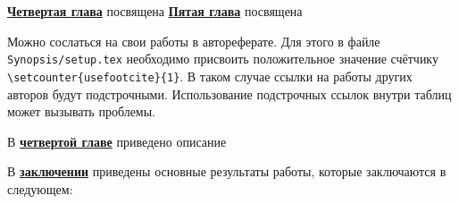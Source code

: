 \underline{\textbf{Четвертая глава}} посвящена 
\underline{\textbf{Пятая глава}} посвящена 


Можно сослаться на свои работы в автореферате. Для этого в файле
\verb!Synopsis/setup.tex! необходимо присвоить положительное значение
счётчику \verb!\setcounter{usefootcite}{1}!. В таком случае ссылки на
работы других авторов будут подстрочными.
Использование подстрочных ссылок внутри таблиц может вызывать проблемы.

В \underline{\textbf{четвертой главе}} приведено описание 

В \underline{\textbf{заключении}} приведены основные результаты работы, которые заключаются в следующем:




